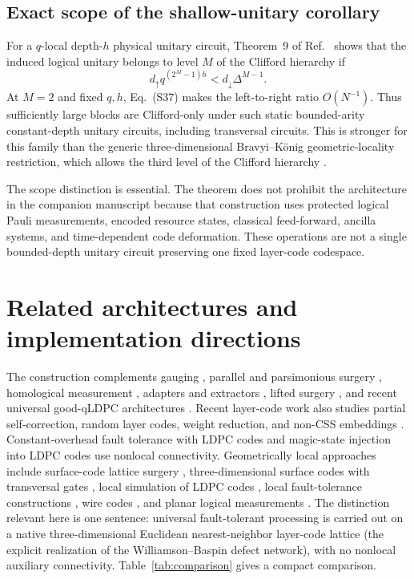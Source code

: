 \documentclass[aps,prx,reprint,superscriptaddress,nofootinbib,floatfix,longbibliography]{revtex4-2}
\theoremstyle{definition}
\begin{document}
\subsection{Exact scope of the shallow-unitary corollary}
For a $q$-local depth-$h$ physical unitary circuit, Theorem~9 of Ref.~\cite{JochymDisjointness}
shows that the induced logical unitary belongs to level $M$ of the Clifford
hierarchy if
\begin{equation}
 d_\uparrow q^{(2^M-1)h}<d_\downarrow\Delta^{M-1}. \tag{S38}
\end{equation}
At $M=2$ and fixed $q,h$, Eq.~(S37) makes the left-to-right ratio
$O(N^{-1})$.  Thus sufficiently large blocks are Clifford-only under such
static bounded-arity constant-depth unitary circuits, including transversal
circuits.  This is stronger for this family than the generic three-dimensional
Bravyi--K\"onig geometric-locality restriction, which allows the third level
of the Clifford hierarchy \cite{BravyiKoenig}.

The scope distinction is essential.  The theorem does not prohibit the
architecture in the companion manuscript because that construction uses protected
logical Pauli measurements, encoded resource states, classical feed-forward,
ancilla systems, and time-dependent code deformation.  These operations are
not a single bounded-depth unitary circuit preserving one fixed layer-code
codespace.


\section{Related architectures and implementation directions}\label{sec:related-extended}
The construction complements gauging \cite{WilliamsonYoderGauging}, parallel and parsimonious surgery \cite{CowtanParallelSurgery,YuanParsimonious2026}, homological measurement \cite{IdeHomological}, adapters and extractors \cite{SwaroopAdapters,HeExtractors}, lifted surgery \cite{BerentLiftedSurgery}, and recent universal good-qLDPC architectures \cite{ZhangGoodQLDPC,MalcolmEfficientQLDPC}.  Recent layer-code work also studies partial self-correction, random layer codes, weight reduction, and non-CSS embeddings \cite{WilliamsonPartialSelfCorrection2025,GuRandomLayerCodes2026,YuanBaspinWeightReduction2026,YuanBaspinNonCSS2026}.  Constant-overhead fault tolerance with LDPC codes \cite{GottesmanFTThreshold,KovalevPryadko,FawziGrospellierLeverrier} and magic-state injection into LDPC codes \cite{ZhangInjectionIndependence,LiuInSituInjection} use nonlocal connectivity.  Geometrically local approaches include surface-code lattice surgery \cite{HorsmanLatticeSurgery,LitinskiSurgery}, three-dimensional surface codes with transversal gates \cite{VasmerBrowne}, local simulation of LDPC codes \cite{PattisonHierarchical}, local fault-tolerance constructions \cite{ChoeKoenigLocal}, wire codes \cite{BaspinWire}, and planar logical measurements \cite{YangPlanar}.  The distinction relevant here is one sentence: universal fault-tolerant processing is carried out on a native three-dimensional Euclidean nearest-neighbor layer-code lattice (the explicit realization of the Williamson--Baspin defect network), with no nonlocal auxiliary connectivity.  Table~\ref{tab:comparison} gives a compact comparison.
\end{document}
